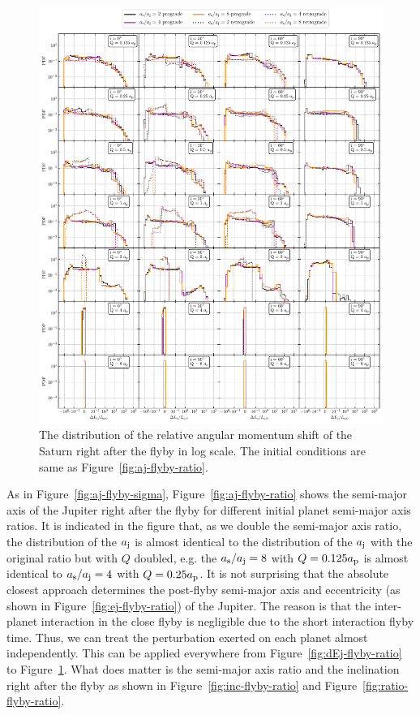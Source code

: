 \documentclass[twocolumn]{aastex63}
\newcommand*\fgr[1]{Figure~\ref{#1}}
\begin{document}
\begin{figure}
    \includegraphics[width=\textwidth]{figs/dLs-flyby-ratio.pdf}
    \caption{The distribution of the relative angular momentum shift of the Saturn right after the flyby in log scale. The initial conditions are same as \fgr{fig:aj-flyby-ratio}.} 
    \label{fig:dLs-flyby-ratio}
\end{figure}



As in \fgr{fig:aj-flyby-sigma}, \fgr{fig:aj-flyby-ratio} shows the semi-major axis of the Jupiter right after the flyby for different initial planet semi-major axis ratios. It is indicated in the figure that, as we double the semi-major axis ratio, the distribution of the $a_{\rm j}$ is  almost identical to the distribution of the $a_{\rm j}$ with the original ratio but with $Q$ doubled, e.g. the $a_{\rm s}/a_{\rm j}=8$ with $Q=0.125a_{\rm p}$ is almost identical to $a_{\rm s}/a_{\rm j}=4$ with $Q=0.25a_{\rm p}$. It is not surprising that the absolute closest approach determines the post-flyby semi-major axis and eccentricity (as shown in \fgr{fig:ej-flyby-ratio}) of the Jupiter. The reason is that the inter-planet interaction in the close flyby is negligible due  to the short interaction flyby time. Thus, we can treat the perturbation exerted on each planet almost independently. This can be applied everywhere from \fgr{fig:dEj-flyby-ratio} to \fgr{fig:dLs-flyby-ratio}. What does matter is the semi-major axis ratio and the inclination right after the flyby as shown in \fgr{fig:inc-flyby-ratio} and \fgr{fig:ratio-flyby-ratio}. 
\end{document}
